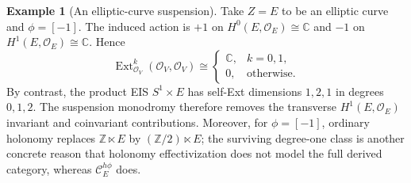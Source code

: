 \documentclass[12pt]{amsart}
\theoremstyle{definition}
\newtheorem{example}[thm]{Example}
\theoremstyle{remark}
\numberwithin{equation}{section}
\newcommand{\CO}{\mathcal O}
\newcommand{\C}{\mathbb C}
\newcommand{\ext}{\operatorname{Ext}}
\begin{document}
\begin{example}[An elliptic-curve suspension]
\label{ex:elliptic-curve-suspension}
Take \(Z=E\) to be an elliptic curve and \(\phi=[-1]\).  The induced action
is \(+1\) on \(H^0(E,\CO_E)\cong\C\) and \(-1\) on
\(H^1(E,\CO_E)\cong\C\).  Hence
\[
\ext^k_{\CO_V}(\CO_V,\CO_V)
\cong
\begin{cases}
\C,&k=0,1,\\
0,&\text{otherwise}.
\end{cases}
\]
By contrast, the product EIS \(S^1\times E\) has self-Ext dimensions
\(1,2,1\) in degrees \(0,1,2\).  The suspension monodromy therefore removes
the transverse \(H^1(E,\CO_E)\) invariant and coinvariant contributions.
Moreover, for \(\phi=[-1]\), ordinary holonomy replaces
\(\mathbb Z\ltimes E\) by \((\mathbb Z/2)\ltimes E\); the surviving
degree-one class is another concrete reason that holonomy effectivization
does not model the full derived category, whereas
\(\mathcal C_E^{h\phi}\) does.
\end{example}

\printbibliography
\end{document}
